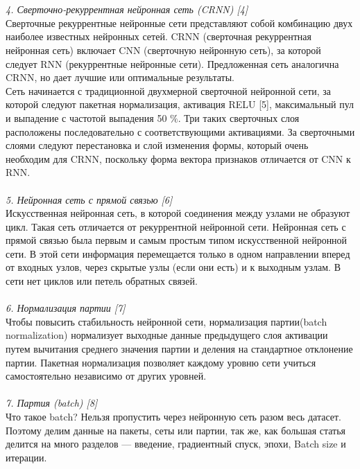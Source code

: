 \documentclass{article}
\begin{document}
    \\ \\
    \textit{4. Сверточно-рекуррентная нейронная сеть (CRNN) [4]}
    \\
    Сверточные рекуррентные нейронные сети представляют собой комбинацию двух наиболее известных нейронных сетей. CRNN (сверточная рекуррентная нейронная сеть) включает CNN (сверточную нейронную сеть), за которой следует RNN (рекуррентные нейронные сети). Предложенная сеть аналогична CRNN, но дает лучшие или оптимальные результаты.
    \\
    Сеть начинается с традиционной двухмерной сверточной нейронной сети, за которой следуют пакетная нормализация, активация RELU [5], максимальный пул и выпадение с частотой выпадения 50 ${\%}$. Три таких сверточных слоя расположены последовательно с соответствующими активациями. За сверточными слоями следуют перестановка и слой изменения формы, который очень необходим для CRNN, поскольку форма вектора признаков отличается от CNN к RNN.
    \\ \\
    \textit{5. Нейронная сеть с прямой связью [6]}
    \\
    Искусственная нейронная сеть, в которой соединения между узлами не образуют цикл. Такая сеть отличается от рекуррентной нейронной сети. Нейронная сеть с прямой связью была первым и самым простым типом искусственной нейронной сети. В этой сети информация перемещается только в одном направлении вперед от входных узлов, через скрытые узлы (если они есть) и к выходным узлам. В сети нет циклов или петель обратных связей.
    \\ \\
    \textit{6. Нормализация партии [7]}
    \\
    Чтобы повысить стабильность нейронной сети, нормализация партии(batch normalization) нормализует выходные данные предыдущего слоя активации путем вычитания среднего значения партии и деления на стандартное отклонение партии. Пакетная нормализация позволяет каждому уровню сети учиться самостоятельно независимо от других уровней.
    \\ \\
    \textit{7. Партия (batch) [8]}
    \\
    Что такое batch? Нельзя пропустить через нейронную сеть разом весь датасет. Поэтому делим данные на пакеты, сеты или партии, так же, как большая статья делится на много разделов — введение, градиентный спуск, эпохи, Batch size и итерации.
    \\ \\
\end{document}
